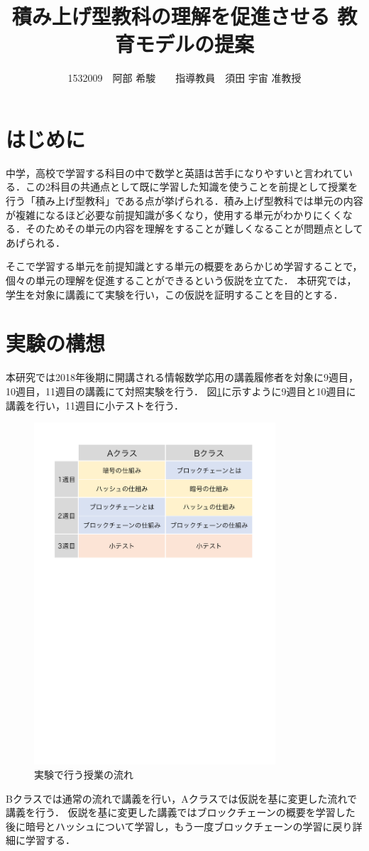 \documentclass[twocolumn,10pt,a4j]{jsarticle}
\title{積み上げ型教科の理解を促進させる
教育モデルの提案}
\author{1532009　阿部 希駿　　指導教員　須田 宇宙 准教授}
\date{}
\begin{document}
\maketitle

\section{はじめに}

中学，高校で学習する科目の中で数学と英語は苦手になりやすいと言われている\cite{1}．この2科目の共通点として既に学習した知識を使うことを前提として授業を行う「積み上げ型教科」である点が挙げられる．積み上げ型教科では単元の内容が複雑になるほど必要な前提知識が多くなり，使用する単元がわかりにくくなる．そのためその単元の内容を理解をすることが難しくなることが問題点としてあげられる．


そこで学習する単元を前提知識とする単元の概要をあらかじめ学習することで，個々の単元の理解を促進することができるという仮説を立てた．
本研究では，学生を対象に講義にて実験を行い，この仮説を証明することを目的とする．


\section{実験の構想}

本研究では2018年後期に開講される情報数学応用の講義履修者を対象に9週目，10週目，11週目の講義にて対照実験を行う．
図\ref{fig:time}に示すように9週目と10週目に講義を行い，11週目に小テストを行う．

\begin{figure}[H]
\centering
\includegraphics[mediaboxonly=/CropBox,width=9cm]{timeline.pdf}
\caption{実験で行う授業の流れ}
\label{fig:time}
\end{figure}
Bクラスでは通常の流れで講義を行い，Aクラスでは仮説を基に変更した流れで講義を行う．
仮説を基に変更した講義ではブロックチェーンの概要を学習した後に暗号とハッシュについて学習し，もう一度ブロックチェーンの学習に戻り詳細に学習する．
\end{document}
